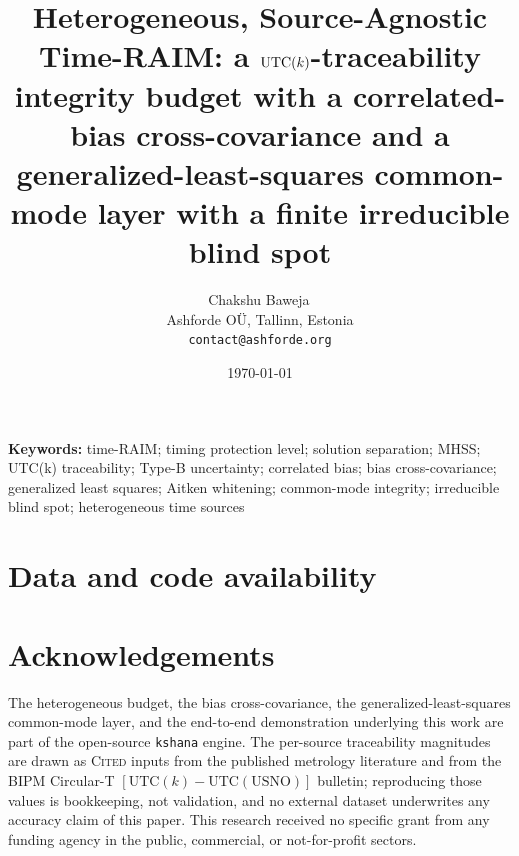 \documentclass[11pt]{article}
\title{\textbf{Heterogeneous, Source-Agnostic Time-RAIM: a $\utck{}$-traceability
integrity budget with a correlated-bias cross-covariance and a
generalized-least-squares common-mode layer with a finite irreducible blind spot}}
\author{Chakshu Baweja\,\orcidlink{0009-0008-2098-0751}\\
\small Ashforde O\"U, Tallinn, Estonia \\
\small \texttt{contact@ashforde.org}}
\date{\today}
\theoremstyle{definition}
\newcommand{\code}[1]{\texttt{#1}}
\newcommand{\utck}{\mathrm{UTC}(k)}               %
\newcommand{\Cited}{\textsc{Cited}}
\begin{document}
\maketitle

\begin{abstract}

\end{abstract}

\noindent\textbf{Keywords:} time-RAIM; timing protection level; solution
separation; MHSS; UTC(k) traceability; Type-B uncertainty; correlated bias;
bias cross-covariance; generalized least squares; Aitken whitening; common-mode
integrity; irreducible blind spot; heterogeneous time sources

\vspace{0.5em}










\section*{Data and code availability}


\section*{Acknowledgements}
The heterogeneous budget, the bias cross-covariance, the generalized-least-squares
common-mode layer, and the end-to-end demonstration underlying this work are part
of the open-source \code{kshana} engine. The per-source traceability magnitudes are
drawn as \Cited{} inputs from the published metrology literature and from the BIPM
Circular-T $[\utck{}-\mathrm{UTC(USNO)}]$ bulletin; reproducing those values is
bookkeeping, not validation, and no external dataset underwrites any accuracy claim
of this paper. This research received no specific grant from any funding agency in
the public, commercial, or not-for-profit sectors.




\appendix

\end{document}

